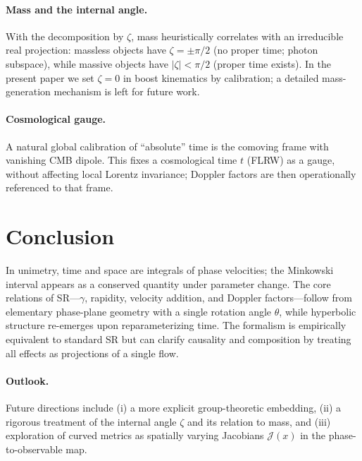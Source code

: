 \documentclass[11pt]{article}
\numberwithin{equation}{section}
\begin{document}
\paragraph{Mass and the internal angle.} With the decomposition by $\zeta$, mass heuristically correlates with an irreducible real projection: massless objects have $\zeta=\pm\pi/2$ (no proper time; photon subspace), while massive objects have $|\zeta|<\pi/2$ (proper time exists). In the present paper we set $\zeta=0$ in boost kinematics by calibration; a detailed mass-generation mechanism is left for future work.

\paragraph{Cosmological gauge.} A natural global calibration of ``absolute'' time is the comoving frame with vanishing CMB dipole. This fixes a cosmological time $t$ (FLRW) as a gauge, without affecting local Lorentz invariance; Doppler factors are then operationally referenced to that frame.

\section{Conclusion}
In unimetry, time and space are integrals of phase velocities; the Minkowski interval appears as a conserved quantity under parameter change. The core relations of SR---$\gamma$, rapidity, velocity addition, and Doppler factors---follow from elementary phase-plane geometry with a single rotation angle $\theta$, while hyperbolic structure re-emerges upon reparameterizing time. The formalism is empirically equivalent to standard SR but can clarify causality and composition by treating all effects as projections of a single flow.

\paragraph{Outlook.} Future directions include (i) a more explicit group-theoretic embedding, (ii) a rigorous treatment of the internal angle $\zeta$ and its relation to mass, and (iii) exploration of curved metrics as spatially varying Jacobians $\mathcal{J}(x)$ in the phase-to-observable map.
\end{document}
